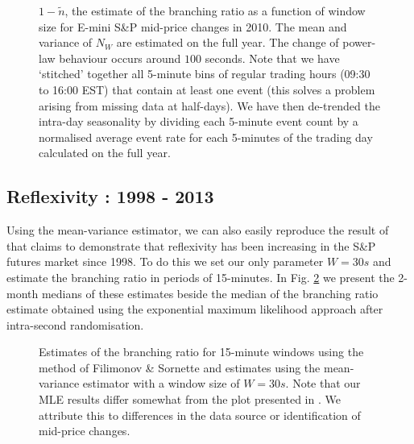 \documentclass{article}
\begin{document}
\begin{figure}[h]
  \caption{\label{fig:n} $1 - \tilde{n}$, the estimate of the branching ratio
  as a function of window size for E-mini S\&P mid-price changes in 2010. The
  mean and variance of $N_W$ are estimated on the full year. The change of
  power-law behaviour occurs around $100$ seconds. Note that we have
  `stitched' together all 5-minute bins of regular trading hours (09:30 to
  16:00 EST) that contain at least one event (this solves a problem arising
  from missing data at half-days). We have then de-trended the intra-day
  seasonality by dividing each 5-minute event count by a normalised average
  event rate for each 5-minutes of the trading day calculated on the full
  year.}
\end{figure}

\subsection{Reflexivity : 1998 - 2013}

Using the mean-variance estimator, we can also easily reproduce the result of
{\cite{filimonov}} that claims to demonstrate that reflexivity has been
increasing in the S\&P futures market since 1998. To do this we set our only
parameter $W = 30 s$ and estimate the branching ratio in periods of
15-minutes. In Fig. \ref{fig:19982013} we present the 2-month medians of these
estimates beside the median of the branching ratio estimate obtained using the
exponential maximum likelihood approach after intra-second randomisation.

\begin{figure}[h]
  \caption{\label{fig:19982013} Estimates of the branching ratio for
  15-minute windows using the method of Filimonov \& Sornette
  {\cite{filimonov}} and estimates using the mean-variance estimator with a
  window size of $W = 30 s$. Note that our MLE results differ somewhat from
  the plot presented in {\cite{filimonov}}. We attribute this to differences
  in the data source or identification of mid-price changes.}
\end{figure}
\end{document}
